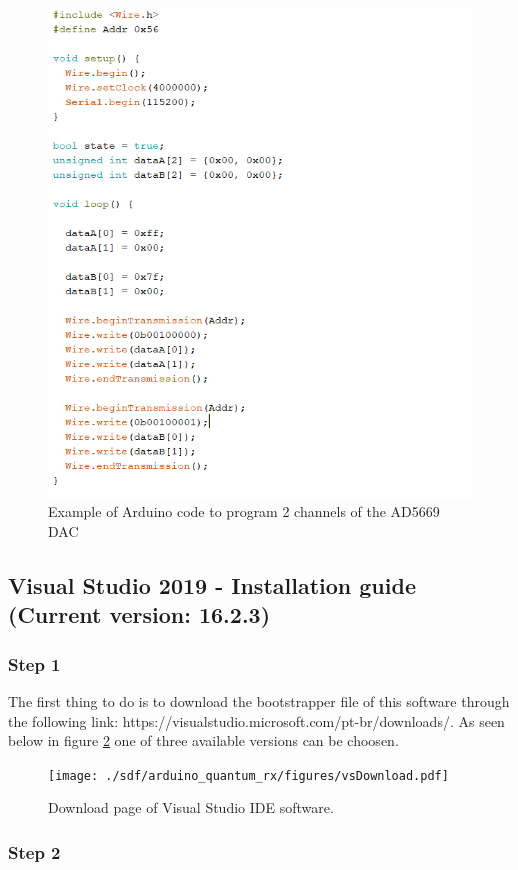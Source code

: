 \begin{refsection}
\begin{figure}[H]
   	\centering
   	\includegraphics[width=0.7\linewidth]{./sdf/arduino_quantum_rx/figures/DACprogram.png}
   	\caption{Example of Arduino code to program 2 channels of the AD5669 DAC}
   	\label{fig:netxpto}
   	
   \end{figure}
	

   \clearpage
	
	\subsection{Visual Studio 2019 - Installation guide (Current version: 16.2.3)}
	
	\subsubsection{Step 1}
	
	The first thing to do is to download the bootstrapper file of this software through the following link: https://visualstudio.microsoft.com/pt-br/downloads/. As seen below in figure \ref{vstudio} one of three available versions can be choosen.
	
	\begin{figure}[H]
		\centering
		\texttt{[image: ./sdf/arduino\_quantum\_rx/figures/vsDownload.pdf]}
		\caption{Download page of Visual Studio IDE software.}
		\label{vstudio}
	\end{figure}
	
	
	\subsubsection{Step 2}
	

\end{refsection}
